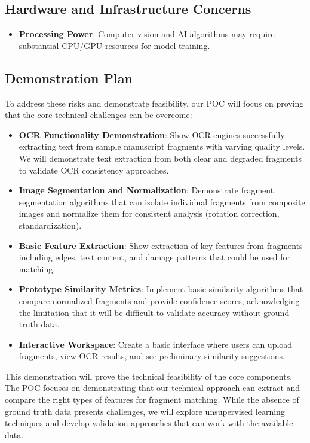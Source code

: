 \documentclass{article}
\begin{document}
\subsection{Hardware and Infrastructure Concerns}

\begin{itemize}
\item \textbf{Processing Power}: Computer vision and AI algorithms may require substantial CPU/GPU resources for model training.
\end{itemize}

\subsection{Demonstration Plan}

To address these risks and demonstrate feasibility, our POC will focus on proving that the core technical challenges can be overcome:

\begin{itemize}
\item \textbf{OCR Functionality Demonstration}: Show OCR engines successfully extracting text from sample manuscript fragments with varying quality levels. We will demonstrate text extraction from both clear and degraded fragments to validate OCR consistency approaches.
\item \textbf{Image Segmentation and Normalization}: Demonstrate fragment segmentation algorithms that can isolate individual fragments from composite images and normalize them for consistent analysis (rotation correction, standardization).
\item \textbf{Basic Feature Extraction}: Show extraction of key features from fragments including edges, text content, and damage patterns that could be used for matching.
\item \textbf{Prototype Similarity Metrics}: Implement basic similarity algorithms that compare normalized fragments and provide confidence scores, acknowledging the limitation that it will be difficult to validate accuracy without ground truth data.
\item \textbf{Interactive Workspace}: Create a basic interface where users can upload fragments, view OCR results, and see preliminary similarity suggestions.
\end{itemize}

This demonstration will prove the technical feasibility of the core components. The POC focuses on demonstrating that our technical approach can extract and compare the right types of features for fragment matching. While the absence of ground truth data presents challenges, we will explore unsupervised learning techniques and develop validation approaches that can work with the available data.
\end{document}
